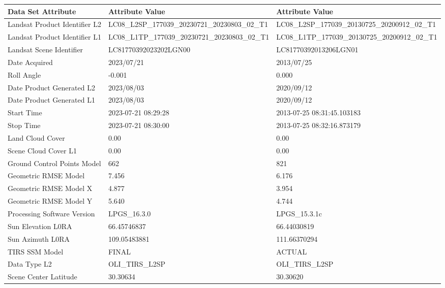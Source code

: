 \documentclass[final,5p,times,twocolumn]{elsarticle}
\numberwithin{table}{section}
\begin{document}
\begin{table}[t]
    \centering
    \small{
     \begin{tabular}{|l|l|l|}
    \hline
        	\textbf{Data Set Attribute} & \textbf{Attribute Value} & \textbf{Attribute Value} \\ \hline
        Landsat Product Identifier L2 & LC08\_L2SP\_177039\_20230721\_20230803\_02\_T1 & LC08\_L2SP\_177039\_20130725\_20200912\_02\_T1 \\ \hline
        Landsat Product Identifier L1 & LC08\_L1TP\_177039\_20230721\_20230803\_02\_T1 & LC08\_L1TP\_177039\_20130725\_20200912\_02\_T1 \\ \hline
        Landsat Scene Identifier & LC81770392023202LGN00 & LC81770392013206LGN01 \\ \hline
        Date Acquired & 2023/07/21 & 2013/07/25 \\ \hline
        Roll Angle & -0.001 & 0.000 \\ \hline
        Date Product Generated L2 & 2023/08/03 & 2020/09/12 \\ \hline
        Date Product Generated L1 & 2023/08/03 & 2020/09/12 \\ \hline
        Start Time & 2023-07-21 08:29:28 & 2013-07-25 08:31:45.103183 \\ \hline
        Stop Time & 2023-07-21 08:30:00 & 2013-07-25 08:32:16.873179 \\ \hline
        Land Cloud Cover & 0.00 & 0.00 \\ \hline
        Scene Cloud Cover L1 & 0.00 & 0.00 \\ \hline
        Ground Control Points Model & 662 & 821 \\ \hline
        Geometric RMSE Model & 7.456 & 6.176 \\ \hline
        Geometric RMSE Model X & 4.877 & 3.954 \\ \hline
        Geometric RMSE Model Y & 5.640 & 4.744 \\ \hline
        Processing Software Version & LPGS\_16.3.0 & LPGS\_15.3.1c \\ \hline
        Sun Elevation L0RA & 66.45746837 & 66.44030819 \\ \hline
        Sun Azimuth L0RA & 109.05483881 & 111.66370294 \\ \hline
        TIRS SSM Model & FINAL & ACTUAL \\ \hline
        Data Type L2 & OLI\_TIRS\_L2SP & OLI\_TIRS\_L2SP \\ \hline
        Scene Center Latitude & 30.30634 & 30.30620 \\ \hline

\end{tabular}}
\end{table}
\end{document}
